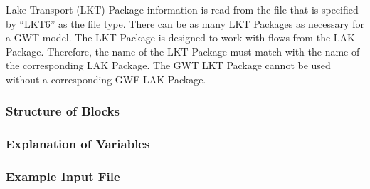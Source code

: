 Lake Transport (LKT) Package information is read from the file that is specified by ``LKT6'' as the file type.  There can be as many LKT Packages as necessary for a GWT model. The LKT Package is designed to work with flows from the LAK Package.  Therefore, the name of the LKT Package must match with the name of the corresponding LAK Package.  The GWT LKT Package cannot be used without a corresponding GWF LAK Package.

\vspace{5mm}
\subsubsection{Structure of Blocks}





\vspace{5mm}
\subsubsection{Explanation of Variables}
\begin{description}

\end{description}

\vspace{5mm}
\subsubsection{Example Input File}



